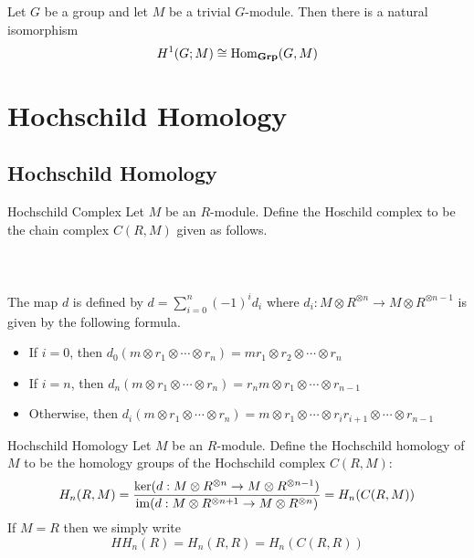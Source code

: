 \documentclass[a4paper]{article}
\begin{document}
\begin{crl}{}{} Let $G$ be a group and let $M$ be a trivial $G$-module. Then there is a natural isomorphism $$H^1(G;M)\cong\operatorname{Hom}_\bold{Grp}(G,M)$$
\end{crl}
\pagebreak

\section{Hochschild Homology}
\subsection{Hochschild Homology}
\begin{defn}{Hochschild Complex}{} Let $M$ be an $R$-module. Define the Hoschild complex to be the chain complex $C(R,M)$ given as follows. \\~\\
\\~\\
The map $d$ is defined by $d=\sum_{i=0}^n(-1)^id_i$ where $d_i:M\otimes R^{\otimes n}\to M\otimes R^{\otimes n-1}$ is given by the following formula. 
\begin{itemize}
\item If $i=0$, then $d_0(m\otimes r_1\otimes\cdots\otimes r_n)=mr_1\otimes r_2\otimes\cdots\otimes r_n$
\item If $i=n$, then $d_n(m\otimes r_1\otimes\cdots\otimes r_n)=r_nm\otimes r_1\otimes\cdots\otimes r_{n-1}$
\item Otherwise, then $d_i(m\otimes r_1\otimes\cdots\otimes r_n)=m\otimes r_1\otimes\cdots\otimes r_ir_{i+1}\otimes \cdots\otimes r_{n-1}$
\end{itemize}
\end{defn}

\begin{defn}{Hochschild Homology}{} Let $M$ be an $R$-module. Define the Hochschild homology of $M$ to be the homology groups of the Hochschild complex $C(R,M)$: $$H_n(R,M)=\frac{\ker(d:M\otimes R^{\otimes n}\to M\otimes R^{\otimes n-1})}{\operatorname{im}(d:M\otimes R^{\otimes n+1}\to M\otimes R^{\otimes n})}=H_n(C(R,M))$$ If $M=R$ then we simply write $$HH_n(R)=H_n(R,R)=H_n(C(R,R))$$
\end{defn}
\end{document}
